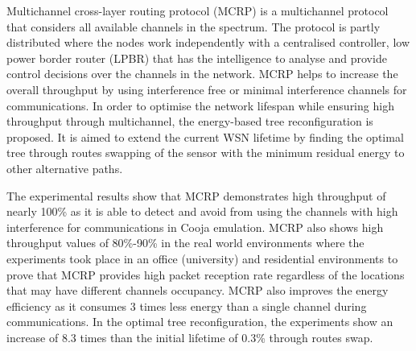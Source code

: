 Multichannel cross-layer routing protocol (MCRP\footnotemark) is a multichannel protocol that considers all available channels in the spectrum. The protocol is partly distributed where the nodes work independently with a centralised controller, low power border router (LPBR) that has the intelligence to analyse and provide control decisions over the channels in the network. MCRP helps to increase the overall throughput by using interference free or minimal interference channels for communications.
In order to optimise the network lifespan while ensuring high throughput through multichannel, the energy-based tree reconfiguration is proposed. It is aimed to extend the current WSN lifetime by finding the optimal tree through routes swapping of the sensor with the minimum residual energy to other alternative paths. 

The experimental results show that MCRP demonstrates high throughput of nearly 100\% as it is able to detect and avoid from using the channels with high interference for communications
in Cooja emulation. MCRP also shows high throughput values of 80\%-90\% in the real world environments where the experiments took place in an office (university) and residential environments to prove that MCRP provides high packet reception rate regardless of the locations that may have different channels occupancy. 
MCRP also improves the energy efficiency as it consumes 3 times less energy than a single channel during communications.
In the optimal tree reconfiguration, the experiments show an increase of 8.3 times than the initial lifetime of 0.3\% through routes swap.



